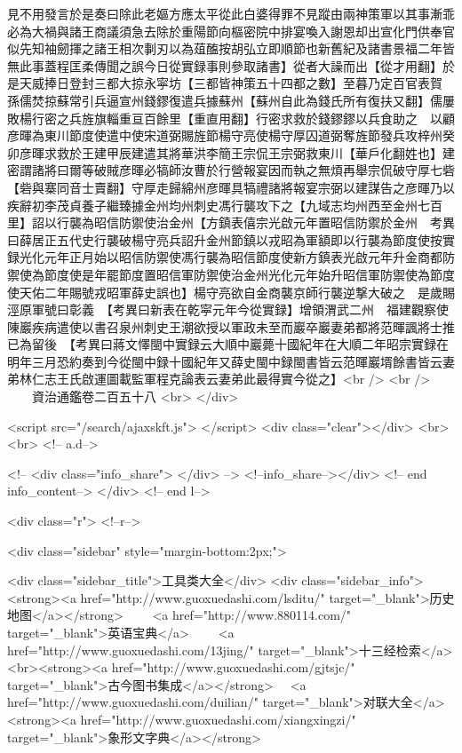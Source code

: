 見不用發言於是奏曰除此老嫗方應太平從此白婆得罪不見蹤由兩神策軍以其事漸乖必為大禍與諸王商議須急去除於重陽節向樞密院中排宴喚入謝恩却出宣化門供奉官似先知袖劒揮之諸王相次剚刃以為葅醢按胡弘立即順節也新舊紀及諸書景福二年皆無此事蓋程匡柔傳聞之誤今日從實録事則參取諸書】從者大譟而出【從才用翻】於是天威捧日登封三都大掠永寜坊【三都皆神策五十四都之數】至暮乃定百官表賀　孫儒焚掠蘇常引兵逼宣州錢鏐復遣兵據蘇州【蘇州自此為錢氏所有復扶又翻】儒屢敗楊行密之兵旌旗輜重亘百餘里【重直用翻】行密求救於錢鏐鏐以兵食助之　以顧彦暉為東川節度使遣中使宋道弼賜旌節楊守亮使楊守厚囚道弼奪旌節發兵攻梓州癸卯彦暉求救於王建甲辰建遣其將華洪李簡王宗侃王宗弼救東川【華戶化翻姓也】建密謂諸將曰爾等破賊彦暉必犒師汝曹於行營報宴因而執之無煩再舉宗侃破守厚七砦【砦與寨同音士賣翻】守厚走歸綿州彦暉具犒禮諸將報宴宗弼以建謀告之彦暉乃以疾辭初李茂貞養子繼臻據金州均州刺史馮行襲攻下之【九域志均州西至金州七百里】詔以行襲為昭信防禦使治金州【方鎮表僖宗光啟元年置昭信防禦於金州　考異曰薛居正五代史行襲破楊守亮兵詔升金州節鎮以戎昭為軍額即以行襲為節度使按實録光化元年正月始以昭信防禦使馮行襲為昭信節度使新方鎮表光啟元年升金商都防禦使為節度使是年罷節度置昭信軍防禦使治金州光化元年始升昭信軍防禦使為節度使天佑二年賜號戎昭軍薛史誤也】楊守亮欲自金商襲京師行襲逆撃大破之　是歲賜涇原軍號曰彰義　【考異曰新表在乾寜元年今從實録】增領渭武二州　福建觀察使陳巖疾病遣使以書召泉州刺史王潮欲授以軍政未至而巖卒巖妻弟都將范暉諷將士推已為留後　【考異曰蔣文懌閩中實録云大順中巖薨十國紀年在大順二年昭宗實録在明年三月恐約奏到今從閩中録十國紀年又薛史閩中録閩書皆云范暉巖壻餘書皆云妻弟林仁志王氏啟運圖載監軍程克論表云妻弟此最得實今從之】<br />
<br />
　　資治通鑑卷二百五十八  <br>
   </div> 

<script src="/search/ajaxskft.js"> </script>
 <div class="clear"></div>
<br>
<br>
 <!-- a.d-->

 <!--
<div class="info_share">
</div> 
-->
 <!--info_share--></div>   <!-- end info_content-->
  </div> <!-- end l-->

<div class="r">   <!--r-->



<div class="sidebar"  style="margin-bottom:2px;">

 
<div class="sidebar_title">工具类大全</div>
<div class="sidebar_info">
<strong><a href="http://www.guoxuedashi.com/lsditu/" target="_blank">历史地图</a></strong>　　
<a href="http://www.880114.com/" target="_blank">英语宝典</a>　　
<a href="http://www.guoxuedashi.com/13jing/" target="_blank">十三经检索</a>　
<br><strong><a href="http://www.guoxuedashi.com/gjtsjc/" target="_blank">古今图书集成</a></strong>　
<a href="http://www.guoxuedashi.com/duilian/" target="_blank">对联大全</a>　<strong><a href="http://www.guoxuedashi.com/xiangxingzi/" target="_blank">象形文字典</a></strong>　

